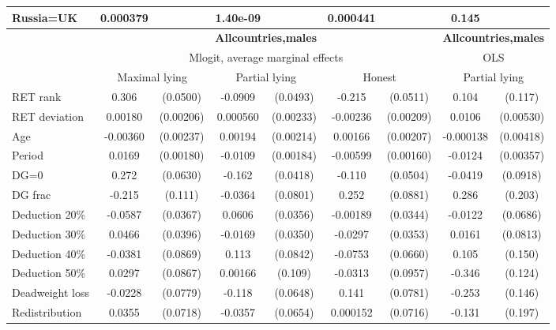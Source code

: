 \begin{tabular}{l|cccccc|cc}
Russia=UK       & 0.000379         &         & 1.40e-09         &         & 0.000441         &         &    0.145         &         \\
\hline\hline
&\multicolumn{6}{c|}{\bf All\space{}countries,\space{}males}&\multicolumn{2}{c}{\bf All\space{}countries,\space{}males}\\ &\multicolumn{6}{c|}{Mlogit, average marginal effects }&\multicolumn{2}{c}{OLS}\\
                &\multicolumn{2}{c}{Maximal lying}&\multicolumn{2}{c}{Partial lying}&\multicolumn{2}{c|}{Honest}  &\multicolumn{2}{c}{Partial lying}\\
\hline
RET rank        &    0.306\sym{***}& (0.0500)&  -0.0909\sym{*}  & (0.0493)&   -0.215\sym{***}& (0.0511)&    0.104         &  (0.117)\\
RET deviation   &  0.00180         &(0.00206)& 0.000560         &(0.00233)& -0.00236         &(0.00209)&   0.0106\sym{**} &(0.00530)\\
Age             & -0.00360         &(0.00237)&  0.00194         &(0.00214)&  0.00166         &(0.00207)&-0.000138         &(0.00418)\\
Period          &   0.0169\sym{***}&(0.00180)&  -0.0109\sym{***}&(0.00184)& -0.00599\sym{***}&(0.00160)&  -0.0124\sym{***}&(0.00357)\\
DG=0          &    0.272\sym{***}& (0.0630)&   -0.162\sym{***}& (0.0418)&   -0.110\sym{**} & (0.0504)&  -0.0419         & (0.0918)\\
DG frac         &   -0.215\sym{*}  &  (0.111)&  -0.0364         & (0.0801)&    0.252\sym{***}& (0.0881)&    0.286         &  (0.203)\\
Deduction 20\%&  -0.0587         & (0.0367)&   0.0606\sym{*}  & (0.0356)& -0.00189         & (0.0344)&  -0.0122         & (0.0686)\\
Deduction 30\%&   0.0466         & (0.0396)&  -0.0169         & (0.0350)&  -0.0297         & (0.0353)&   0.0161         & (0.0813)\\
Deduction 40\%&  -0.0381         & (0.0869)&    0.113         & (0.0842)&  -0.0753         & (0.0660)&    0.105         &  (0.150)\\
Deduction 50\%&   0.0297         & (0.0867)&  0.00166         &  (0.109)&  -0.0313         & (0.0957)&   -0.346\sym{***}&  (0.124)\\
Deadweight loss&  -0.0228         & (0.0779)&   -0.118\sym{*}  & (0.0648)&    0.141\sym{*}  & (0.0781)&   -0.253\sym{*}  &  (0.146)\\
Redistribution&   0.0355         & (0.0718)&  -0.0357         & (0.0654)& 0.000152         & (0.0716)&   -0.131         &  (0.197)\\

\end{tabular}
